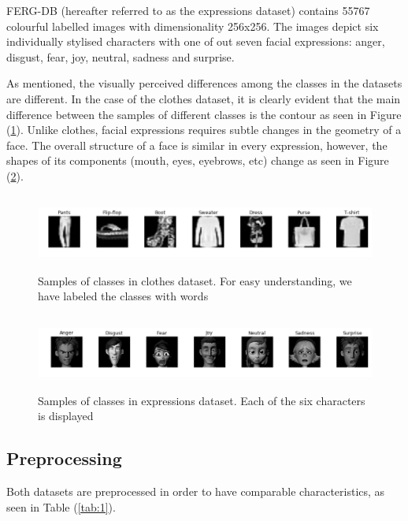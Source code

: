 \documentclass{article}
\begin{document}
FERG-DB (hereafter referred to as the expressions dataset) contains 55767 colourful labelled images with dimensionality 256x256. The images depict six individually stylised characters with one of out seven facial expressions: anger, disgust, fear, joy, neutral, sadness and surprise.

As mentioned, the visually perceived differences among the classes in the datasets are different. In the case of the clothes dataset, it is clearly evident that the main difference between the samples of different classes is the contour as seen in Figure (\ref{fig:1}). Unlike clothes, facial expressions requires subtle changes in the geometry of a face. The overall structure of a face is similar in every expression, however, the shapes of its components (mouth, eyes, eyebrows, etc) change as seen in Figure (\ref{fig:2}).
\begin{figure}[tb]
	\vskip 5mm
		\begin{center}
			\includegraphics[width=\textwidth,height=2.5cm]{original_clothes}
			\caption{Samples of classes in clothes dataset. For easy understanding, we have labeled the classes with words}
			\label{fig:1}
		\end{center}
	\vskip -5mm
\end{figure}

\begin{figure}[tb]
	\vskip 5mm
		\begin{center}
			\includegraphics[width=\textwidth,height=2.5cm]{original_expressions}
			\caption{Samples of classes in expressions dataset. Each of the six characters is displayed}
			\label{fig:2}
		\end{center}
	\vskip -5mm
\end{figure}

\subsection{Preprocessing}
\label{sec:preprocessing}
Both datasets are preprocessed in order to have comparable characteristics, as seen in Table (\ref{tab:1}). 
\end{document}
